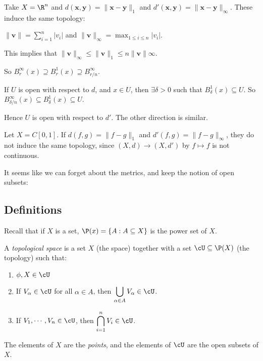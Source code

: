 \documentclass[a4paper]{article}
\begin{document}
\begin{eg}
  Take $X = \R^n$ and $d(\mathbf{x}, \mathbf{y}) = \|\mathbf{x} - \mathbf{y}\|_1$ and $d'(\mathbf{x}, \mathbf{y}) = \|\mathbf{x} - \mathbf{y}\|_\infty$. These induce the same topology:

  $\|\mathbf{v}\| = \sum_{i = 1}^n |v_i|$ and $\|\mathbf{v}\|_\infty = \max_{1 \leq i \leq n}|v_i|$.

  This implies that $\|\mathbf{v}\|_\infty \leq \|\mathbf{v}\|_1 \leq n\|\mathbf{v}\| \infty$.

  So $B_r^\infty(x) \supseteq B_r^1 (x) \supseteq B_{r/n}^\infty$.
  \begin{center}
  \end{center}

  If $U$ is open with respect to $d$, and $x\in U$, then $\exists \delta > 0$ such that $B_\delta^1 (x) \subseteq U$. So $B_{\delta/n}^\infty (x) \subseteq B_\delta^1(x) \subseteq U$.

  Hence $U$ is open with respect to $d'$. The other direction is similar.
\end{eg}

\begin{eg}
  Let $X = C[0, 1]$. If $d(f, g) = \|f - g\|_1$ and $d'(f, g) = \|f - g\|_\infty$, they do not induce the same topology, since $(X, d) \to (X, d')$ by $f\mapsto f$ is not continuous.
\end{eg}

It seems like we can forget about the metrics, and keep the notion of open subsets:
\subsection{Definitions}
Recall that if $X$ is a set, $\P(x) = \{A: A\subseteq X\}$ is the power set of $X$.

\begin{defi}
  A \emph{topological space} is a set $X$ (the space) together with a set $\cU \subseteq \P(X)$ (the topology) such that:
  \begin{enumerate}
    \item $\phi, X\in \cU$
    \item If $V_\alpha\in \cU$ for all $\alpha \in A$, then $\displaystyle \bigcup_{\alpha\in A}V_\alpha \in \cU$.
    \item If $V_1, \cdots, V_n \in \cU$, then $\displaystyle \bigcap_{i = 1}^n V_i \in \cU$.
  \end{enumerate}
  The elements of $X$ are the \emph{points}, and the elements of $\cU$ are the open subsets of $X$.
\end{defi}
\end{document}
